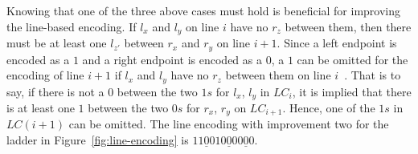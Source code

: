 Knowing that one of the three above cases must hold is beneficial for improving the 
line-based encoding. If $l_{x}$ and $l_{y}$ on line $i$ have no $r_{z}$ between them, 
then there must be at least one $l_{z\prime}$ between $r_{x}$ and $r_{y}$ on line $i+1$.
Since a left endpoint is encoded as a $1$ and a right endpoint is encoded as a $0$, 
a $1$ can be omitted for the encoding of line $i+1$ if $l_{x}$ and $l_{y}$ have no $r_{z}$
between them on line $i$~\cite{A5}. That is to say, if there is not a $0$ between 
the two  $1s$ for $l_{x}$, $l_{y}$ in $LC_{i}$, it is implied that there is at least one $1$ between 
the two $0s$ for $r_{x}$, $r_{y}$ on $LC_{i+1}$. Hence, one of the $1s$ in $LC(i+1)$ can be omitted. 
The line encoding with improvement two for the ladder in Figure~\ref{fig:line-encoding} is $11\underline{0}010\underline{0}00\underline{0}0$.
